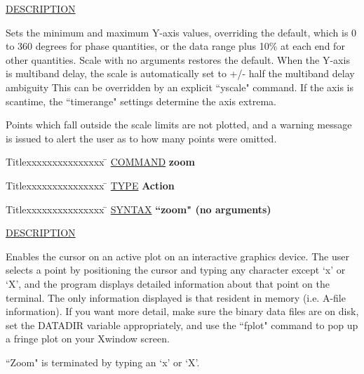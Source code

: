 \underline{DESCRIPTION}
\begin{list}{}{\setlength{\leftmargin}{0.5in}
     \setlength{\rightmargin}{0in}}
\item
Sets the minimum and maximum Y-axis values, overriding the
default, which is 0 to 360 degrees for phase quantities, or
the data range plus 10\% at each end for other quantities.
Scale with no arguments restores the default.  When
the Y-axis is multiband delay, the scale is automatically set
to +/- half the multiband delay ambiguity
This can be overridden by an explicit ``yscale" command.
If the axis is scantime, the ``timerange" settings determine
the axis extrema.
\item
Points which fall outside the scale limits are not plotted, and
a warning message is issued to alert the user as to how many
points were omitted.
\end{list}
\vspace{.2in}

\begin{tabbing}
Titlexxxxxxxxxxxxxxx \= \kill
\underline{COMMAND} \> {\bf 	zoom} \\
\end{tabbing}

\begin{tabbing}
Titlexxxxxxxxxxxxxxx \= \kill
\underline{TYPE} \> {\bf 		Action} \\
\end{tabbing}

\begin{tabbing}
Titlexxxxxxxxxxxxxxx \= \kill
\underline{SYNTAX} \> {\bf 		``zoom" (no arguments)} \\
\end{tabbing}

\underline{DESCRIPTION}
\begin{list}{}{\setlength{\leftmargin}{0.5in}
     \setlength{\rightmargin}{0in}}
\item
Enables the cursor on an active plot on an interactive
graphics device.  The user selects a point by positioning
the cursor and typing any character except `x' or `X', and 
the program displays detailed information about that point 
on the terminal.  The only information displayed 
is that resident in memory (i.e. A-file information). If you
want more detail, make sure the binary data files are on
disk, set the DATADIR variable appropriately, and use the
``fplot" command to pop up a fringe plot on your Xwindow
screen.
\item
``Zoom" is terminated by typing an `x' or `X'.
\end{list}
\vspace{.2in}



